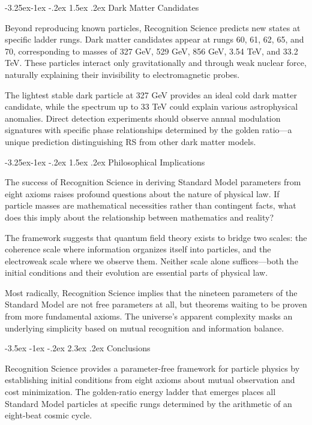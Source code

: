 \documentclass[11pt,a4paper]{article}
\makeatletter
\renewcommand\section{\@startsection{section}{1}{\z@}%
  {-3.5ex \@plus -1ex \@minus -.2ex}%
  {2.3ex \@plus.2ex}%
  {\normalfont\Large\bfseries\color{darkblue}}}
\renewcommand\subsection{\@startsection{subsection}{2}{\z@}%
  {-3.25ex\@plus -1ex \@minus -.2ex}%
  {1.5ex \@plus .2ex}%
  {\normalfont\large\bfseries\color{darkblue}}}
\theoremstyle{definition}
\makeatother
\begin{document}
\subsection{Dark Matter Candidates}

Beyond reproducing known particles, Recognition Science predicts new states at specific ladder rungs. Dark matter candidates appear at rungs 60, 61, 62, 65, and 70, corresponding to masses of 327 GeV, 529 GeV, 856 GeV, 3.54 TeV, and 33.2 TeV. These particles interact only gravitationally and through weak nuclear force, naturally explaining their invisibility to electromagnetic probes.

The lightest stable dark particle at 327 GeV provides an ideal cold dark matter candidate, while the spectrum up to 33 TeV could explain various astrophysical anomalies. Direct detection experiments should observe annual modulation signatures with specific phase relationships determined by the golden ratio—a unique prediction distinguishing RS from other dark matter models.

\subsection{Philosophical Implications}

The success of Recognition Science in deriving Standard Model parameters from eight axioms raises profound questions about the nature of physical law. If particle masses are mathematical necessities rather than contingent facts, what does this imply about the relationship between mathematics and reality?

The framework suggests that quantum field theory exists to bridge two scales: the coherence scale where information organizes itself into particles, and the electroweak scale where we observe them. Neither scale alone suffices—both the initial conditions and their evolution are essential parts of physical law.

Most radically, Recognition Science implies that the nineteen parameters of the Standard Model are not free parameters at all, but theorems waiting to be proven from more fundamental axioms. The universe's apparent complexity masks an underlying simplicity based on mutual recognition and information balance.

\section{Conclusions}

Recognition Science provides a parameter-free framework for particle physics by establishing initial conditions from eight axioms about mutual observation and cost minimization. The golden-ratio energy ladder that emerges places all Standard Model particles at specific rungs determined by the arithmetic of an eight-beat cosmic cycle.
\end{document}
